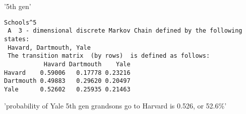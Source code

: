 \documentclass[11pt]{article}
\begin{document}
    '5th gen'

    
    
    \begin{verbatim}
Schools^5 
 A  3 - dimensional discrete Markov Chain defined by the following states: 
 Havard, Dartmouth, Yale 
 The transition matrix  (by rows)  is defined as follows: 
           Havard Dartmouth    Yale
Havard    0.59006   0.17778 0.23216
Dartmouth 0.49883   0.29620 0.20497
Yale      0.52602   0.25935 0.21463

    \end{verbatim}

    
    'probability of Yale 5th gen grandsons go to Harvard is 0.526, or 52.6\%'

    

    
    
    
    
\end{document}
